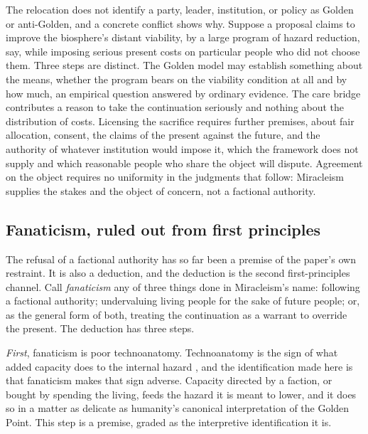 The relocation does not identify a party, leader, institution, or policy as
Golden or anti-Golden, and a concrete conflict shows why. Suppose a proposal
claims to improve the biosphere's distant viability, by a large program of
hazard reduction, say, while imposing serious present costs on particular
people who did not choose them. Three steps are distinct. The Golden model may
establish something about the means, whether the program bears on the
viability condition at all and by how much, an empirical question answered by
ordinary evidence. The care bridge contributes a reason to take the
continuation seriously and nothing about the distribution of costs. Licensing
the sacrifice requires further premises, about fair allocation, consent, the
claims of the present against the future, and the authority of whatever
institution would impose it, which the framework does not supply and which
reasonable people who share the object will dispute. Agreement on the object
requires no uniformity in the judgments that follow: Miracleism supplies the
stakes and the object of concern, not a factional authority.

\subsection*{Fanaticism, ruled out from first principles}

The refusal of a factional authority has so far been a premise of the paper's
own restraint. It is also a deduction, and the deduction is the second
first-principles channel. Call \emph{fanaticism} any of three things done in
Miracleism's name: following a factional authority; undervaluing living
people for the sake of future people; or, as the general form of both,
treating the continuation as a warrant to override the present. The
deduction has three steps.

\emph{First}, fanaticism is poor technoanatomy. Technoanatomy is the sign of
what added capacity does to the internal hazard
\cite{GoldenTechnoanatomy}, and the identification made here is that
fanaticism makes that sign adverse. Capacity directed by a faction, or bought
by spending the living, feeds the hazard it is meant to lower, and it does so
in a matter as delicate as humanity's canonical interpretation of the Golden
Point. This step is a
premise, graded as the interpretive identification it is.

